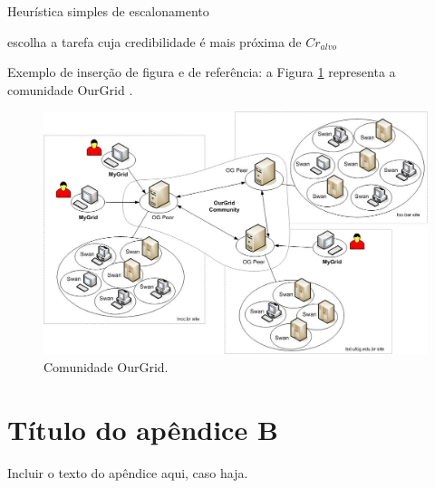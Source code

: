 \documentclass[a4paper,titlepage,12pt]{article}
\begin{document}



\begin{algorithm}
\caption{Heurística simples de escalonamento} \label{alg:heuristica}
\small
\begin{algorithmic}

    \STATE escolha a tarefa cuja credibilidade é mais próxima de $Cr_{alvo}$
\ENDIF

\end {algorithmic}
\end {algorithm}


Exemplo de inserção de figura e de referência: a Figura \ref{fig:ourgrid} representa a comunidade OurGrid \cite{Paranhos:03}.

\begin{figure}[ht]
\centering
\includegraphics[width=.80\textwidth]{figs/ourgrid.jpg}
\caption{Comunidade OurGrid.} \label{fig:ourgrid}
\end{figure}



\section{Título do apêndice B}
\label{ape:apeB}

Incluir o texto do apêndice aqui, caso haja.
\end{document}
